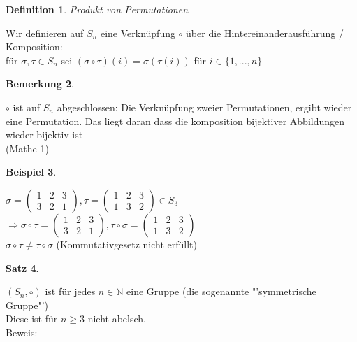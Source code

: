 \documentclass[a4paper,11pt]{article}
\newtheorem{definition}{Definition}[section]
\newtheorem{satz}[definition]{Satz}
\newtheorem{bsp}[definition]{Beispiel}
\newtheorem{bem}[definition]{Bemerkung}
\begin{document}
\begin{definition}
Produkt von Permutationen
\end{definition}
Wir definieren auf $S_n$ eine Verknüpfung $\circ$ über die Hintereinanderausführung / Komposition: \\
für $\sigma,\tau\in S_n$ sei $(\sigma\circ\tau)(i)=\sigma(\tau(i))$ für $i\in\{1,...,n\}$
\begin{bem}
\end{bem}
$\circ$ ist auf $S_n$ abgeschlossen: Die Verknüpfung zweier Permutationen, ergibt wieder eine Permutation. Das liegt daran dass die komposition bijektiver Abbildungen wieder bijektiv ist \\
(Mathe 1)
\begin{bsp}
\end{bsp}
$\sigma=\begin{pmatrix}1&2&3\\3&2&1\end{pmatrix}, \tau=\begin{pmatrix}1&2&3\\1&3&2\end{pmatrix}\in S_3$ \\
$\Rightarrow\sigma\circ\tau=\begin{pmatrix}1&2&3\\3&2&1\end{pmatrix}, \tau\circ\sigma=\begin{pmatrix}1&2&3\\1&3&2\end{pmatrix}$ \\
$\sigma\circ\tau\neq\tau\circ\sigma$ (Kommutativgesetz nicht erfüllt)
\begin{satz}
\end{satz}
$(S_n,\circ)$ ist für jedes $n\in\mathbb{N}$ eine Gruppe (die sogenannte "'symmetrische Gruppe"') \\
Diese ist für $n\geq 3$ nicht abelsch. \\
Beweis: \\
\end{document}
